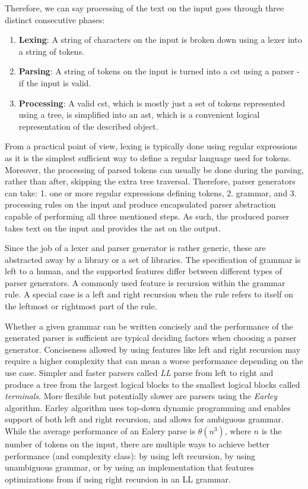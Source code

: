 Therefore, we can say processing of the text on the input goes through three distinct consecutive phases:

\begin{enumerate}
    \item \textbf{Lexing}: A string of characters on the input is broken down using a lexer into a string of tokens.
    \item \textbf{Parsing}: A string of tokens on the input is turned into a \gls{cst} using a parser - if the input is valid.
    \item \textbf{Processing}: A valid \gls{cst}, which is mostly just a set of tokens represented using a tree, is simplified into an \gls{ast}, which is a convenient logical representation of the described object.
\end{enumerate}

From a practical point of view, lexing is typically done using regular expressions as it is the simplest sufficient way to define a regular language used for tokens.
Moreover, the processing of parsed tokens can usually be done during the parsing, rather than after, skipping the extra tree traversal.
Therefore, parser generators can take: 1. one or more regular expressions defining tokens, 2. grammar, and 3. processing rules on the input and produce encapsulated parser abstraction capable of performing all three mentioned steps.
As such, the produced parser takes text on the input and provides the \gls{ast} on the output.

Since the job of a lexer and parser generator is rather generic, these are abstracted away by a library or a set of libraries.
The specification of grammar is left to a human, and the supported features differ between different types of parser generators.
A commonly used feature is recursion within the grammar rule.
A special case is a left and right recursion when the rule refers to itself on the leftmost or rightmost part of the rule.

Whether a given grammar can be written concisely and the performance of the generated parser is sufficient are typical deciding factors when choosing a parser generator.
Conciseness allowed by using features like left and right recursion may require a higher complexity that can mean a worse performance depending on the use case.
Simpler and faster parsers called \emph{LL} parse from left to right and produce a tree from the largest logical blocks to the smallest logical blocks called \emph{terminals}.
More flexible but potentially slower are parsers using the \emph{Earley} algorithm.
Earley algorithm uses top-down dynamic programming and enables support of both left and right recursion, and allows for ambiguous grammar.
While the average performance of an Ealery parse is $\theta(n^3)$, where $n$ is the number of tokens on the input, there are multiple ways to achieve better performance (and complexity class): by using left recursion, by using unambiguous grammar, or by using an implementation that features optimizations from \textcite{leo_general_1991} if using right recursion in an LL grammar.
